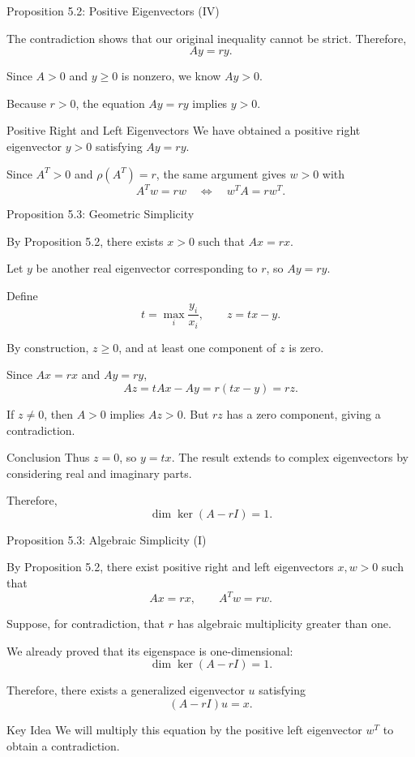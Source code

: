 \documentclass[aspectratio=169,10pt]{beamer}
\begin{document}
\begin{frame}[shrink=0]{Proposition 5.2: Positive Eigenvectors (IV)}
\small

The contradiction shows that our
original inequality cannot be strict.
Therefore,
\[
Ay=ry.
\]

Since $A>0$ and $y\geq0$ is nonzero,
we know $Ay>0$.

Because $r>0$, the equation $Ay=ry$
implies $y>0$.

\begin{block}{Positive Right and Left Eigenvectors}
We have obtained a positive right
eigenvector $y>0$ satisfying $Ay=ry$.

Since $A^T>0$ and $\rho(A^T)=r$,
the same argument gives $w>0$ with
\[
A^Tw=rw
\quad\Longleftrightarrow\quad
w^TA=rw^T.
\]
\end{block}

\end{frame}


\begin{frame}[shrink=0]{Proposition 5.3: Geometric Simplicity}
\small

By Proposition 5.2, there exists $x>0$
such that $Ax=rx$.

Let $y$ be another real eigenvector
corresponding to $r$, so $Ay=ry$.

Define
\[
t=\max_i\frac{y_i}{x_i},
\qquad z=tx-y.
\]

By construction, $z\geq0$, and at least
one component of $z$ is zero.

Since $Ax=rx$ and $Ay=ry$,
\[
Az=tAx-Ay=r(tx-y)=rz.
\]

If $z\neq0$, then $A>0$ implies $Az>0$.
But $rz$ has a zero component,
giving a contradiction.

\begin{block}{Conclusion}
Thus $z=0$, so $y=tx$.
The result extends to complex eigenvectors
by considering real and imaginary parts.

Therefore,
\[
\boxed{\dim\ker(A-rI)=1.}
\]
\end{block}

\end{frame}


\begin{frame}[shrink=0]{Proposition 5.3: Algebraic Simplicity (I)}
\small

By Proposition 5.2, there exist positive
right and left eigenvectors $x,w>0$ such that
\[
Ax=rx,\qquad A^Tw=rw.
\]

Suppose, for contradiction, that $r$
has algebraic multiplicity greater than one.

We already proved that its eigenspace is
one-dimensional:
\[
\dim\ker(A-rI)=1.
\]

Therefore, there exists a generalized
eigenvector $u$ satisfying
\[
(A-rI)u=x.
\]

\begin{block}{Key Idea}
We will multiply this equation by the
positive left eigenvector $w^T$ to
obtain a contradiction.
\end{block}

\end{frame}
\end{document}
